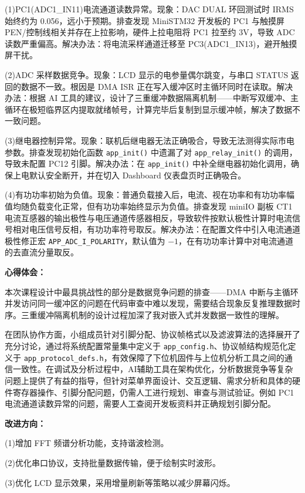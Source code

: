 \documentclass[UTF8,a4paper,zihao=-4,fontset=macnew]{ctexart}
\begin{document}
(1)PC1(ADC1\_IN11)电流通道读数异常。现象：DAC DUAL 环回测试时 IRMS 始终约为 0.056，远小于预期。排查发现 MiniSTM32 开发板的 PC1 与触摸屏 PEN/控制线相关并存在上拉影响，硬件上拉电阻将 PC1 拉至约 3V，导致 ADC 读数严重偏高。解决办法：将电流采样通道迁移至 PC3(ADC1\_IN13)，避开触摸屏干扰。

(2)ADC 采样数据竞争。现象：LCD 显示的电参量偶尔跳变，与串口 STATUS 返回的数据不一致。根因是 DMA ISR 正在写入缓冲区时主循环同时在读取。解决办法：根据 AI 工具的建议，设计了三重缓冲数据隔离机制——中断写双缓冲、主循环在极短临界区内提取就绪帧号，计算完毕后复制到显示缓冲帧，解决了数据不一致问题。

(3)继电器控制异常。现象：联机后继电器无法正确吸合，导致无法测得实际市电参数。排查发现初始化函数 \texttt{app\_init()} 中遗漏了对 \texttt{app\_relay\_init()} 的调用，导致未配置 PC12 引脚。解决办法：在 \texttt{app\_init()} 中补全继电器初始化调用，确保上电默认安全断开，并在切入 Dashboard 仪表盘页时正确吸合。

(4)有功功率初始为负值。现象：普通负载接入后，电流、视在功率和有功功率幅值均随负载变化正常，但有功功率始终显示为负值。排查发现 miniIO 副板 CT1 电流互感器的输出极性与电压通道传感器相反，导致软件按默认极性计算时电流信号相对电压信号反相，有功功率符号取反。解决办法：在配置文件中引入电流通道极性修正宏 \texttt{APP\_ADC\_I\_POLARITY}，默认值为 $-1$，在有功功率计算中对电流通道的去直流分量取反。

\textbf{心得体会：}

本次课程设计中最具挑战性的部分是数据竞争问题的排查——DMA 中断与主循环并发访问同一缓冲区的问题在代码审查中难以发现，需要结合现象反复推理数据时序。三重缓冲隔离机制的设计过程加深了我对嵌入式并发数据一致性的理解。

在团队协作方面，小组成员针对引脚分配、协议帧格式以及滤波算法的选择展开了充分讨论，通过将系统配置常量集中定义于 \texttt{app\_config.h}、协议帧结构规范化定义于 \texttt{app\_protocol\_defs.h}，有效保障了下位机固件与上位机分析工具之间的通信一致性。在调试及分析过程中，AI辅助工具在架构优化，分析数据竞争等复杂问题上提供了有益的指导，但针对菜单界面设计、交互逻辑、需求分析和具体的硬件寄存器操作、引脚分配问题，仍需人工进行规划、审查与测试验证。例如 PC1 电流通道读数异常的问题，需要人工查阅开发板资料并正确规划引脚分配。

\textbf{改进方向：}

(1)增加 FFT 频谱分析功能，支持谐波检测。

(2)优化串口协议，支持批量数据传输，便于绘制实时波形。

(3)优化 LCD 显示效果，采用增量刷新等策略以减少屏幕闪烁。
\end{document}
